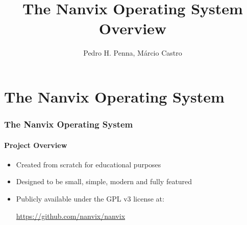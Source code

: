 \documentclass{beamer}
\title[Nanvix]{%
	\textbf{%
		The Nanvix Operating System\\
		\small{Overview}
	}
}
\author[Pedro H. Penna, Márcio Castro]{%
	Pedro H. Penna, Márcio Castro%
}
\institute{
	\url{pedrohenriquepenna@gmail.com}
}
\begin{document}
\frame{\titlepage}

\section{The Nanvix Operating System}

		\begin{frame}
		\frametitle{The Nanvix Operating System}
		\framesubtitle{Project Overview}
			\begin{itemize}
			\setlength\itemsep{0.5em}
				\item Created from scratch for educational purposes
				
				\item Designed to be small, simple, modern and fully featured
				
				\item Publicly available under the GPL v3 license at:
					\\[1em]
					\begin{center}
						\url{https://github.com/nanvix/nanvix}
					\end{center}
			\end{itemize}


\end{frame}
\end{document}
